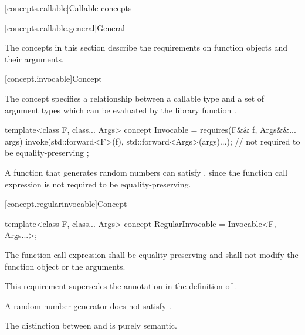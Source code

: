 [concepts.callable]{Callable concepts}

[concepts.callable.general]{General}

\pnum
The concepts in this section describe the requirements on function
objects and their arguments.

[concept.invocable]{Concept }

\pnum
The  concept specifies a relationship between a callable
type  and a set of argument types  which
can be evaluated by the library function .

%
\begin{itemdecl}
template<class F, class... Args>
  concept Invocable = requires(F&& f, Args&&... args) {
    invoke(std::forward<F>(f), std::forward<Args>(args)...); // not required to be equality-preserving
  };
\end{itemdecl}

\begin{itemdescr}
\pnum
\begin{example}
A function that generates random numbers can satisfy ,
since the  function call expression is not required to be
equality-preserving.
\end{example}
\end{itemdescr}

[concept.regularinvocable]{Concept }

%
\begin{itemdecl}
template<class F, class... Args>
  concept RegularInvocable = Invocable<F, Args...>;
\end{itemdecl}

\begin{itemdescr}
\pnum
The  function call expression shall be equality-preserving and
shall not modify the function object or the
arguments.
\begin{note}
This requirement supersedes the annotation in the definition of
.
\end{note}

\pnum
\begin{example}
A random number generator does not satisfy
.
\end{example}

\pnum
\begin{note}
The distinction between  and 
is purely semantic.
\end{note}
\end{itemdescr}

